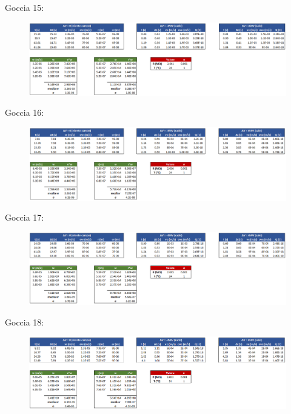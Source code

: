 \documentclass{article}
\begin{document}
\pagebreak

Goccia 15:

\begin{figure}[h]
\centering
\includegraphics[width=\linewidth]{Goccia15}
\end{figure}

\vspace{10mm}

Goccia 16:

\begin{figure}[h]
\centering
\includegraphics[width=\linewidth]{Goccia16}
\end{figure}

\vspace{10mm}

Goccia 17:

\begin{figure}[h]
\centering
\includegraphics[width=\linewidth]{Goccia17}
\end{figure}

\pagebreak

Goccia 18:

\begin{figure}[h]
\centering
\includegraphics[width=\linewidth]{Goccia18}
\end{figure}
\end{document}
